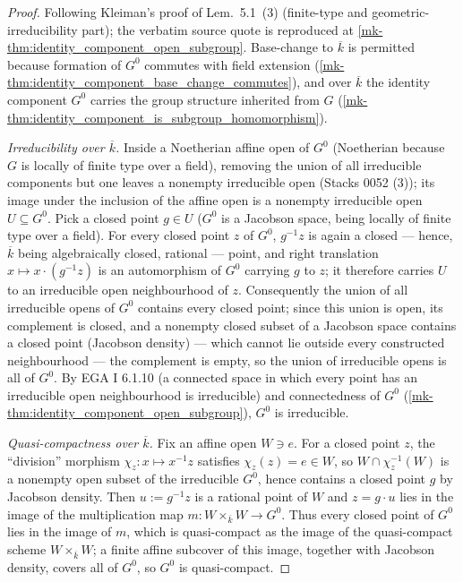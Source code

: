 \begin{proof}
  \leanok{}
  Following Kleiman's proof of Lem.~5.1~(3) (finite-type and
  geometric-irreducibility part); the verbatim source quote is
  reproduced at \ref{mk-thm:identity_component_open_subgroup}. Base-change to
  \(\overline k\) is permitted because formation of \(G^0\) commutes with
  field extension (\ref{mk-thm:identity_component_base_change_commutes}), and
  over \(\overline k\) the identity component \(G^0\) carries the group
  structure inherited from \(G\)
  (\ref{mk-thm:identity_component_is_subgroup_homomorphism}).

  \emph{Irreducibility over \(\overline k\).}  Inside a Noetherian affine
  open of \(G^0\) (Noetherian because \(G\) is locally of finite type over a
  field), removing the union of all irreducible components but one leaves a
  nonempty irreducible open (Stacks 0052 (3)); its image under the
  inclusion of the affine open is a nonempty irreducible open
  \(U \subseteq G^0\). Pick a closed point \(g \in U\) (\(G^0\) is a
  Jacobson space, being locally of finite type over a field). For every
  closed point \(z\) of \(G^0\), \(g^{-1}z\) is again a closed --- hence,
  \(\overline k\) being algebraically closed, rational --- point, and right
  translation \(x \mapsto x \cdot (g^{-1}z)\) is an automorphism of \(G^0\)
  carrying \(g\) to \(z\); it therefore carries \(U\) to an irreducible open
  neighbourhood of \(z\). Consequently the union of all irreducible opens of
  \(G^0\) contains every closed point; since this union is open, its
  complement is closed, and a nonempty closed subset of a Jacobson space
  contains a closed point (Jacobson density) --- which cannot lie outside
  every constructed neighbourhood --- the complement is empty, so the union
  of irreducible opens is all of \(G^0\). By EGA I 6.1.10 (a connected space
  in which every point has an irreducible open neighbourhood is
  irreducible) and connectedness of \(G^0\)
  (\ref{mk-thm:identity_component_open_subgroup}), \(G^0\) is irreducible.

  \emph{Quasi-compactness over \(\overline k\).}  Fix an affine open
  \(W \ni e\). For a closed point \(z\), the ``division'' morphism
  \(\chi_z : x \mapsto x^{-1}z\) satisfies \(\chi_z(z) = e \in W\), so
  \(W \cap \chi_z^{-1}(W)\) is a nonempty open subset of the irreducible
  \(G^0\), hence contains a closed point \(g\) by Jacobson density. Then
  \(u := g^{-1}z\) is a rational point of \(W\) and \(z = g \cdot u\) lies in
  the image of the multiplication map \(m : W \times_{\overline k} W \to
  G^0\). Thus every closed point of \(G^0\) lies in the image of \(m\),
  which is quasi-compact as the image of the quasi-compact scheme
  \(W \times_{\overline k} W\); a finite affine subcover of this image,
  together with Jacobson density, covers all of \(G^0\), so \(G^0\) is
  quasi-compact.


\end{proof}

